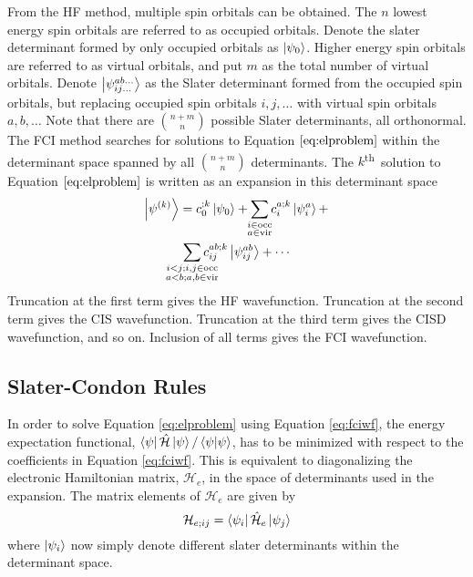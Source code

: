 \documentclass[final,3p,times,twocolumn]{elsarticle}
\newcommand{\ssth}{\textsuperscript{th}}
\newcommand{\ham}{\hat{\mathcal{H}}}
\begin{document}
From the HF method,\cite{roothaan} multiple spin orbitals can be obtained. The $n$ lowest energy spin orbitals are referred to as occupied orbitals. Denote the slater determinant formed by only occupied orbitals as $\ket{\psi_0}$. Higher energy spin orbitals are referred to as virtual orbitals, and put $m$ as the total number of virtual orbitals. Denote $\ket{\psi_{ij\ldots}^{ab\ldots}}$ as the Slater determinant formed from the occupied spin orbitals, but replacing occupied spin orbitals $i, j, \ldots$ with virtual spin orbitals $a, b, \ldots$ Note that there are $\binom{n+m}{n}$ possible Slater determinants, all orthonormal. The FCI method searches for solutions to Equation $\ref{eq:elproblem}$ within the determinant space spanned by all $\binom{n+m}{n}$ determinants. The $k$\ssth\ solution to Equation $\eqref{eq:elproblem}$ is written as an expansion in this determinant space
\begin{equation}\label{eq:fciwf}
\begin{gathered}
\ket{\psi^{(k)}} = c_0^{;k}\ket{\psi_0} + \sum_{\mathclap{\substack{i\in\text{occ} \\ a \in\text{vir}}}} c_i^{a;k}\ket{\psi_i^a} + \\
\sum_{\mathclap{\substack{i < j; i, j \in\text{occ} \\ a < b; a, b \in\text{vir}}}} c_{ij}^{ab;k}\ket{\psi_{ij}^{ab}} 
+ \cdots
\end{gathered}
\end{equation}
Truncation at the first term gives the HF wavefunction. Truncation at the second term gives the CIS wavefunction. Truncation at the third term gives the CISD wavefunction, and so on. Inclusion of all terms gives the FCI wavefunction.

\subsection{Slater-Condon Rules} \label{sec:condonrules}
In order to solve Equation \eqref{eq:elproblem} using Equation \eqref{eq:fciwf}, the energy expectation functional, $\bra{\psi}\hat{\mathcal H}\ket{\psi} / \bra{\psi}\ket{\psi}$, has to be minimized with respect to the coefficients in Equation \eqref{eq:fciwf}. This is equivalent to diagonalizing the electronic Hamiltonian matrix, $\mathcal H_e$, in the space of determinants used in the expansion. The matrix elements of $\mathcal H_e$ are given by
\begin{equation} \label{eq:hmat}
\mathcal H_{e;ij} = \bra{\psi_i}\ham_e\ket{\psi_j}
\end{equation}
where $\ket{\psi_i}$ now simply denote different slater determinants within the determinant space.
\end{document}
